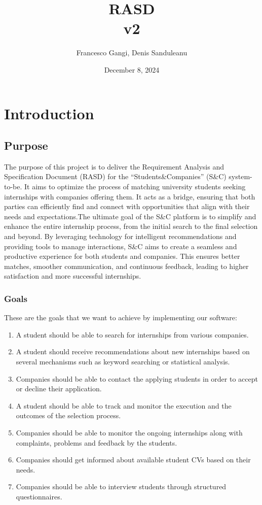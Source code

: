\documentclass{article}
\title{RASD \\ [0.5ex] \small v2}
\author{Francesco Gangi, Denis Sanduleanu}
\date{December 8, 2024}
\begin{document}
\maketitle

\newpage

\tableofcontents

\newpage

\section{Introduction}

\subsection{Purpose}
The purpose of this project is to deliver the Requirement Analysis and Specification Document (RASD) for the “Students\&Companies” (S\&C) system-to-be. It aims to optimize the process of matching university students seeking internships with companies offering them. It acts as a bridge, ensuring that both parties can efficiently find and connect with opportunities that align with their needs and expectations.The ultimate goal of the S\&C platform is to simplify and enhance the entire internship process, from the initial search to the final selection and beyond. By leveraging technology for intelligent recommendations and providing tools to manage interactions, S\&C aims to create a seamless and productive experience for both students and companies. This ensures better matches, smoother communication, and continuous feedback, leading to higher satisfaction and more successful internships.




\subsubsection{Goals}
These are the goals that we want to achieve by implementing our software:

\begin{enumerate}[label=G\arabic*.]
    \item A student should be able to search for internships from various companies.
    \item A student should receive recommendations about new internships based on several mechanisms such as keyword searching or statistical analysis.
    \item Companies should be able to contact the applying students in order to accept or decline their application.
    \item A student should be able to track and monitor the execution and the outcomes of the selection process.
    \item Companies should be able to monitor the ongoing internships along with complaints, problems and feedback by the students.

    \item Companies should get informed about available student CVs based on their needs.
    \item Companies should be able to interview students through structured questionnaires.
\end{enumerate}
\end{document}
